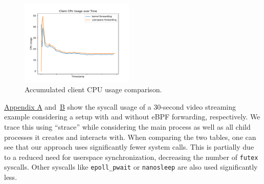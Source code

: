 \begin{figure}[H]
\begin{minipage}{0.48\textwidth}
    \end{minipage}\hfill
    \begin{minipage}{\textwidth}
        \centering
        \includegraphics[width=0.48\textwidth]{figures/04_testing_and_results/cpu_usage_client_ns.pdf}
        \caption[Client CPU usage comparison]{Accumulated client CPU usage comparison.}\label{fig:cpu-utilization-client}
    \end{minipage}
\end{figure}



\hyperref[chap:appendix-fast-relay]{Appendix A} and~\hyperref[chap:appendix-plain-relay]{B} show 
the syscall usage of a 30-second video streaming example considering a setup with and without eBPF 
forwarding, respectively.
We trace this using ``strace'' while considering the main process as well as all child processes
it creates and interacts with.
When comparing the two tables, one can see that our approach uses significantly fewer system calls.
This is partially due to a reduced need for userspace synchronization, decreasing the number of \verb|futex| syscalls.
Other syscalls like \verb|epoll_pwait| or \verb|nanosleep| are also used significantly less.

